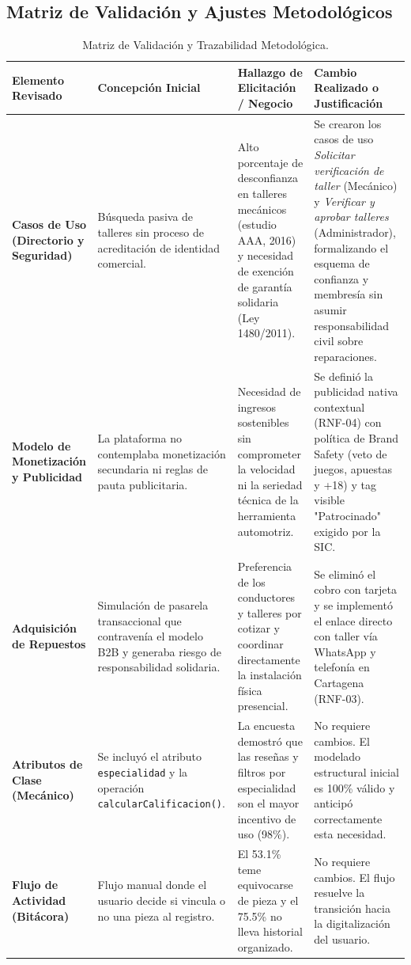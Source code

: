 \documentclass[11pt,letterpaper]{article}
\begin{document}
\newpage

\subsection{Matriz de Validación y Ajustes Metodológicos}

\begin{table}[h!]
\centering
\small
\begin{tabularx}{\textwidth}{p{2.8cm}p{3.2cm}p{3.8cm}X}
\toprule
\textbf{Elemento Revisado} & \textbf{Concepción Inicial} & \textbf{Hallazgo de Elicitación / Negocio} & \textbf{Cambio Realizado o Justificación} \\
\midrule
\textbf{Casos de Uso (Directorio y Seguridad)} & Búsqueda pasiva de talleres sin proceso de acreditación de identidad comercial. & Alto porcentaje de desconfianza en talleres mecánicos (estudio AAA, 2016) y necesidad de exención de garantía solidaria (Ley 1480/2011). & Se crearon los casos de uso \textit{Solicitar verificación de taller} (Mecánico) y \textit{Verificar y aprobar talleres} (Administrador), formalizando el esquema de confianza y membresía sin asumir responsabilidad civil sobre reparaciones. \\
\addlinespace
\textbf{Modelo de Monetización y Publicidad} & La plataforma no contemplaba monetización secundaria ni reglas de pauta publicitaria. & Necesidad de ingresos sostenibles sin comprometer la velocidad ni la seriedad técnica de la herramienta automotriz. & Se definió la publicidad nativa contextual (RNF-04) con política de Brand Safety (veto de juegos, apuestas y +18) y tag visible "Patrocinado" exigido por la SIC. \\
\addlinespace
\textbf{Adquisición de Repuestos} & Simulación de pasarela transaccional que contravenía el modelo B2B y generaba riesgo de responsabilidad solidaria. & Preferencia de los conductores y talleres por cotizar y coordinar directamente la instalación física presencial. & Se eliminó el cobro con tarjeta y se implementó el enlace directo con taller vía WhatsApp y telefonía en Cartagena (RNF-03). \\
\addlinespace
\textbf{Atributos de Clase (Mecánico)} & Se incluyó el atributo \texttt{especialidad} y la operación \texttt{calcularCalificacion()}. & La encuesta demostró que las reseñas y filtros por especialidad son el mayor incentivo de uso (98\%). & No requiere cambios. El modelado estructural inicial es 100\% válido y anticipó correctamente esta necesidad. \\
\addlinespace
\textbf{Flujo de Actividad (Bitácora)} & Flujo manual donde el usuario decide si vincula o no una pieza al registro. & El 53.1\% teme equivocarse de pieza y el 75.5\% no lleva historial organizado. & No requiere cambios. El flujo resuelve la transición hacia la digitalización del usuario. \\
\bottomrule
\end{tabularx}
\caption{Matriz de Validación y Trazabilidad Metodológica.}
\end{table}
\end{document}
